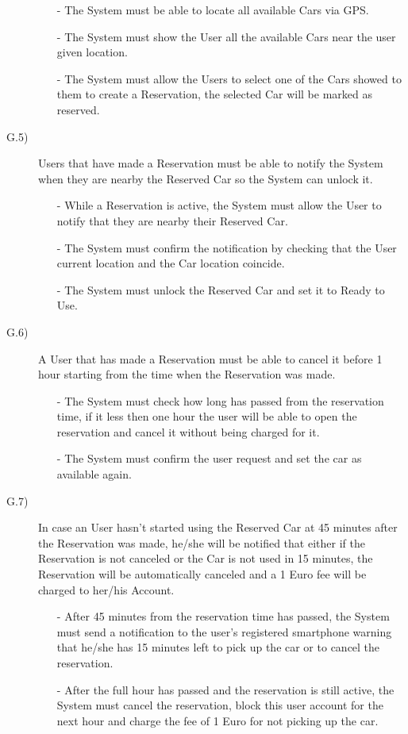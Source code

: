 \documentclass[a4paper]{article}
\begin{document}
\begin{description}
\begin{itemize}
	\item[-]The System must be able to locate all available Cars via GPS.
	\item[-]The System must show the User all the available Cars near the user given location.
	\item[-]The System must allow the Users to select one of the Cars showed to them to create a Reservation, the selected Car will be marked as reserved.
\end{itemize}
\item [G.5)]Users that have made a Reservation must be able to notify the System when they are nearby the Reserved Car so the System can unlock it.
\begin{itemize}
	\item[-]While a Reservation is active, the System must allow the User to notify that they are nearby their Reserved Car.
	\item[-]The System must confirm the notification by checking that the User current location and the Car location coincide.
	\item[-]The System must unlock the Reserved Car and set it to Ready to Use.
\end{itemize}
\item [G.6)]A User that has made a Reservation must be able to cancel it before 1 hour starting from the time when the Reservation was made.
\begin{itemize}
	\item[-]The System must check how long has passed from the reservation time, if it less then one hour the user will be able to open the reservation and cancel it without being charged for it.
	\item[-]The System must confirm the user request and set the car as available again.
\end{itemize}
\item [G.7)]In case an User hasn't started using the Reserved Car at 45 minutes after the Reservation was made, he/she will be notified that either if the Reservation is not canceled or the Car is not used in 15 minutes, the Reservation will be automatically canceled and a 1 Euro fee will be charged to her/his Account.
\begin{itemize}
	\item[-]After 45 minutes from the reservation time has passed, the System must send a notification to the user's registered smartphone warning that he/she has 15 minutes left to pick up the car or to cancel the reservation.
	\item[-]After the full hour has passed and the reservation is still active, the System must cancel the reservation, block this user account for the next hour and charge the fee of 1 Euro for not picking up the car.

\end{itemize}
\end{description}
\end{document}
